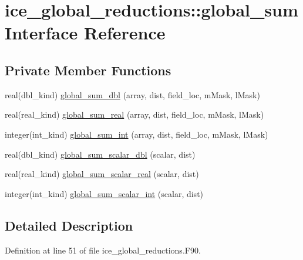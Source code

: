 \hypertarget{interfaceice__global__reductions_1_1global__sum}{
\section{ice\_\-global\_\-reductions::global\_\-sum Interface Reference}
\label{interfaceice__global__reductions_1_1global__sum}
}
\subsection*{Private Member Functions}
\begin{DoxyCompactItemize}
\item 
real(dbl\_\-kind) \hyperlink{interfaceice__global__reductions_1_1global__sum_a1190bcf6a3a0b414c8c2f481a79e0088}{global\_\-sum\_\-dbl} (array, dist, field\_\-loc, mMask, lMask)
\item 
real(real\_\-kind) \hyperlink{interfaceice__global__reductions_1_1global__sum_a73890257a8f46762fe99973c0b0f6e65}{global\_\-sum\_\-real} (array, dist, field\_\-loc, mMask, lMask)
\item 
integer(int\_\-kind) \hyperlink{interfaceice__global__reductions_1_1global__sum_a644cf2af22aa7d96b1fe3325c528a1a5}{global\_\-sum\_\-int} (array, dist, field\_\-loc, mMask, lMask)
\item 
real(dbl\_\-kind) \hyperlink{interfaceice__global__reductions_1_1global__sum_a65b1ad99e12b8d3d726e1fb6f0ba4b59}{global\_\-sum\_\-scalar\_\-dbl} (scalar, dist)
\item 
real(real\_\-kind) \hyperlink{interfaceice__global__reductions_1_1global__sum_aef81b51d3b8ad33123f117c90349337c}{global\_\-sum\_\-scalar\_\-real} (scalar, dist)
\item 
integer(int\_\-kind) \hyperlink{interfaceice__global__reductions_1_1global__sum_a3555f8d28d69c88ae230f621c236367e}{global\_\-sum\_\-scalar\_\-int} (scalar, dist)
\end{DoxyCompactItemize}


\subsection{Detailed Description}


Definition at line 51 of file ice\_\-global\_\-reductions.F90.

